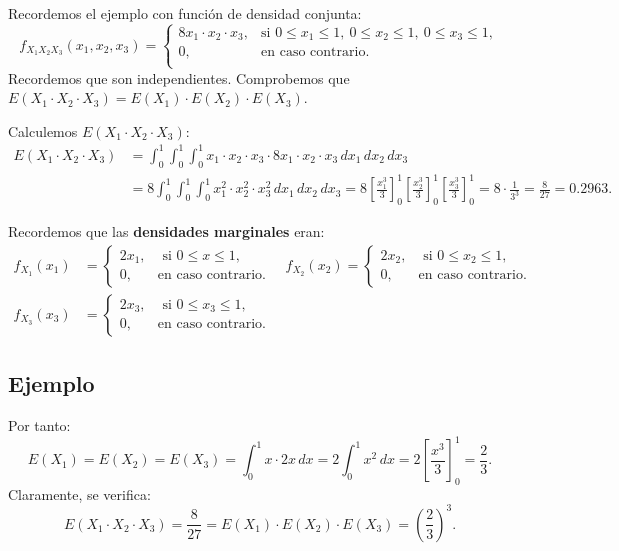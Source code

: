 \documentclass[]{book}
\begin{document}
Recordemos el ejemplo con función de densidad conjunta:
\[
f_{X_1X_2X_3}(x_1,x_2,x_3)=\begin{cases}
8 x_1\cdot x_2\cdot x_3, & \mbox{si }0\leq x_1\leq 1,\ 0\leq x_2\leq 1,\ 0\leq x_3\leq 1, \\
0, & \mbox{en caso contrario.}\\
\end{cases}
\]
Recordemos que son independientes. Comprobemos que \(E(X_1\cdot X_2\cdot X_3)=E(X_1)\cdot E(X_2)\cdot E(X_3)\).

Calculemos \(E(X_1\cdot X_2\cdot X_3)\):
\[
\begin{array}{rl}
E(X_1\cdot X_2\cdot X_3)  & = \int_0^1\int_0^1\int_0^1 x_1\cdot x_2\cdot x_3\cdot 8 x_1\cdot x_2\cdot x_3\,dx_1\, dx_2\, dx_3 \\ & = 8\int_0^1\int_0^1\int_0^1 x_1^2\cdot x_2^2\cdot x_3^2\,dx_1\, dx_2\, dx_3 =8\left[\frac{x_1^3}{3}\right]_0^1\left[\frac{x_2^3}{3}\right]_0^1
\left[\frac{x_3^3}{3}\right]_0^1 = 8\cdot \frac{1}{3^3}=\frac{8}{27}=0.2963.
\end{array}
\]

Recordemos que las \textbf{densidades marginales} eran:
\[
\begin{array}{rl}
f_{X_1}(x_1) & =\begin{cases}
2x_1, & \mbox{ si }0\leq x\leq 1,\\
0, & \mbox{en caso contrario.}
\end{cases}\quad f_{X_2}(x_2)=\begin{cases}
2x_2, & \mbox{ si }0\leq x_2\leq 1,\\
0, & \mbox{en caso contrario.}
\end{cases}\\ f_{X_3}(x_3) & =\begin{cases}
2x_3, & \mbox{ si }0\leq x_3\leq 1,\\
0, & \mbox{en caso contrario.}
\end{cases}
\end{array}
\]

\hypertarget{ejemplo-134}{%
\subsection{Ejemplo}\label{ejemplo-134}}

Por tanto:
\[
E(X_1)=E(X_2)=E(X_3)=\int_0^1 x\cdot 2 x\, dx =2 \int_0^1 x^2\, dx=2\left[\frac{x^3}{3}\right]_0^1=\frac{2}{3}.
\]
Claramente, se verifica:
\[
E(X_1\cdot X_2\cdot X_3)=\frac{8}{27}=E(X_1)\cdot E(X_2)\cdot E(X_3)=\left(\frac{2}{3}\right)^3.
\]
\end{document}

